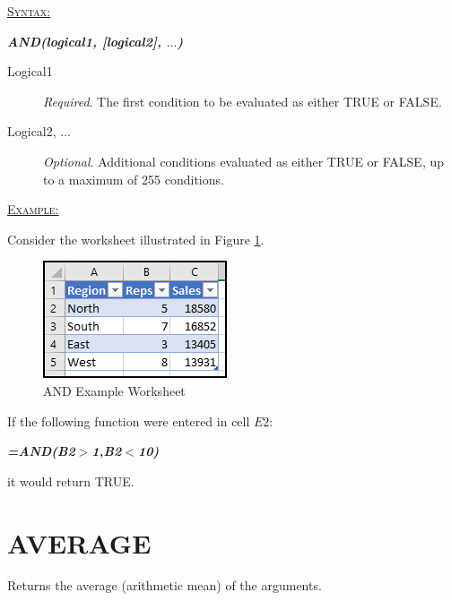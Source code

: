 \begin{addmargin}[1cm]{0cm}
	
	\medskip
	\underline{\textsc{Syntax:}}
	\medskip
	
	{\color{Syntax}
		\noindent\textit{\textbf{AND(logical1, [logical2], $\ldots$)}}
	}
	
	\begin{description}
		\item[Logical1] \textit{Required}. The first condition to be evaluated as either TRUE or FALSE.
		\item[Logical2, $\ldots$] \textit{Optional}. Additional conditions evaluated as either TRUE or FALSE, up to a maximum of 255 conditions.
	\end{description}

	\medskip
	\noindent\underline{\textsc{Example:}}
	\medskip

	\noindent Consider the worksheet illustrated in Figure \ref{apa:and}.
	
	\begin{figure}[H]
		\centering
		\includegraphics[width=\maxwidth{.45\linewidth}]{gfx/apa_fig01}
		\caption{AND Example Worksheet}
		\label{apa:and}
	\end{figure}

	\noindent If the following function were entered in cell $ E2 $:

	{\color{Syntax}
	\textit{\textbf{=AND(B2$>$1,B2$<$10)}}
	}

	\noindent it would return TRUE.

\end{addmargin}

\section{AVERAGE}

Returns the average (arithmetic mean) of the arguments.

